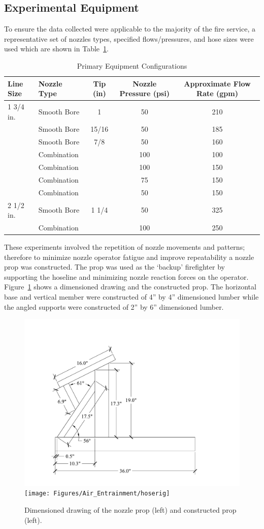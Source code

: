 \documentclass[12pt,oneside]{book}
\begin{document}
\subsection{Experimental Equipment}

To ensure the data collected were applicable to the majority of the fire service, a representative set of nozzles types, specified flows/pressures, and hose sizes were used which are shown in Table~\ref{tab:nozzles_used_detail}.

\begin{table}[!ht]
\centering
\caption{Primary Equipment Configurations}
\label{tab:nozzles_used_detail}
\begin{tabular}{llccc}
\toprule[1.5pt]
Line Size & Nozzle Type & Tip (in) & Nozzle Pressure (psi) & Approximate Flow Rate (gpm) \\ 
\midrule
1 3/4 in. & Smooth Bore          & 1      & 50 & 210 \\
          & Smooth Bore          & 15/16  & 50 & 185 \\
          & Smooth Bore          & 7/8    & 50 & 160 \\
          & Combination          &        & 100 & 100 \\
          & Combination          &        & 100 & 150 \\
          & Combination          &        & 75 & 150 \\
          & Combination          &        & 50 & 150 \\ \midrule
2 1/2 in. & Smooth Bore          & 1 1/4  & 50 & 325 \\
          & Combination          &        & 100 & 250 \\
\bottomrule[1.25pt]
\end{tabular}
\end{table}

These experiments involved the repetition of nozzle movements and patterns; therefore to minimize nozzle operator fatigue and improve repeatability a nozzle prop was constructed. The prop was used as the `backup' firefighter by supporting the hoseline and minimizing nozzle reaction forces on the operator. Figure~\ref{fig:Nozzle_Prop} shows a dimensioned drawing and the constructed prop. The horizontal base and vertical member were constructed of 4'' by 4'' dimensioned lumber while the angled supports were constructed of 2'' by 6'' dimensioned lumber.

\begin{figure}[!ht]
\centering
    \includegraphics[width=.4\columnwidth]{Figures/Water_Distribution/GIBside}
	\texttt{[image: Figures/Air\_Entrainment/hoserig]}
	\caption[Nozzle Prop]{Dimensioned drawing of the nozzle prop (left) and constructed prop (left).}
	\label{fig:Nozzle_Prop}
\end{figure}
\end{document}

